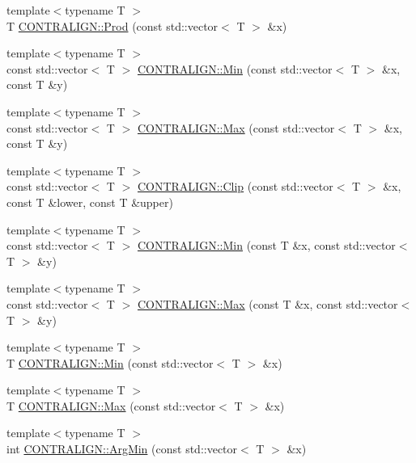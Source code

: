 \begin{DoxyCompactItemize}
\item 
{\footnotesize template$<$typename T $>$ }\\T \hyperlink{namespace_c_o_n_t_r_a_l_i_g_n_ad582c5d78b26a7e58ee7721a42c01da6}{C\+O\+N\+T\+R\+A\+L\+I\+G\+N\+::\+Prod} (const std\+::vector$<$ T $>$ \&x)
\item 
{\footnotesize template$<$typename T $>$ }\\const std\+::vector$<$ T $>$ \hyperlink{namespace_c_o_n_t_r_a_l_i_g_n_a6b53b3062ca847fb117cf013785f8100}{C\+O\+N\+T\+R\+A\+L\+I\+G\+N\+::\+Min} (const std\+::vector$<$ T $>$ \&x, const T \&y)
\item 
{\footnotesize template$<$typename T $>$ }\\const std\+::vector$<$ T $>$ \hyperlink{namespace_c_o_n_t_r_a_l_i_g_n_a6c722fe0306d541389530e375d74ccdf}{C\+O\+N\+T\+R\+A\+L\+I\+G\+N\+::\+Max} (const std\+::vector$<$ T $>$ \&x, const T \&y)
\item 
{\footnotesize template$<$typename T $>$ }\\const std\+::vector$<$ T $>$ \hyperlink{namespace_c_o_n_t_r_a_l_i_g_n_adf2697aa2857fa99795263160b364d3a}{C\+O\+N\+T\+R\+A\+L\+I\+G\+N\+::\+Clip} (const std\+::vector$<$ T $>$ \&x, const T \&lower, const T \&upper)
\item 
{\footnotesize template$<$typename T $>$ }\\const std\+::vector$<$ T $>$ \hyperlink{namespace_c_o_n_t_r_a_l_i_g_n_a29e5e02d8c9a594a18989dd70a67d960}{C\+O\+N\+T\+R\+A\+L\+I\+G\+N\+::\+Min} (const T \&x, const std\+::vector$<$ T $>$ \&y)
\item 
{\footnotesize template$<$typename T $>$ }\\const std\+::vector$<$ T $>$ \hyperlink{namespace_c_o_n_t_r_a_l_i_g_n_a5cc9c10aa252a488e82c2bb32c183747}{C\+O\+N\+T\+R\+A\+L\+I\+G\+N\+::\+Max} (const T \&x, const std\+::vector$<$ T $>$ \&y)
\item 
{\footnotesize template$<$typename T $>$ }\\T \hyperlink{namespace_c_o_n_t_r_a_l_i_g_n_a1b53d2a84cfba4108bb7beb5270fe1c1}{C\+O\+N\+T\+R\+A\+L\+I\+G\+N\+::\+Min} (const std\+::vector$<$ T $>$ \&x)
\item 
{\footnotesize template$<$typename T $>$ }\\T \hyperlink{namespace_c_o_n_t_r_a_l_i_g_n_a7a9aa6d2e9f21b56e04c47dc9bda0a12}{C\+O\+N\+T\+R\+A\+L\+I\+G\+N\+::\+Max} (const std\+::vector$<$ T $>$ \&x)
\item 
{\footnotesize template$<$typename T $>$ }\\int \hyperlink{namespace_c_o_n_t_r_a_l_i_g_n_ab012f896d978a3dffc160298b00000be}{C\+O\+N\+T\+R\+A\+L\+I\+G\+N\+::\+Arg\+Min} (const std\+::vector$<$ T $>$ \&x)

\end{DoxyCompactItemize}
